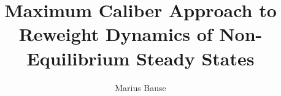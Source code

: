 \author{Marius Bause}
\title{Maximum Caliber Approach to Reweight Dynamics of Non-Equilibrium Steady States }

